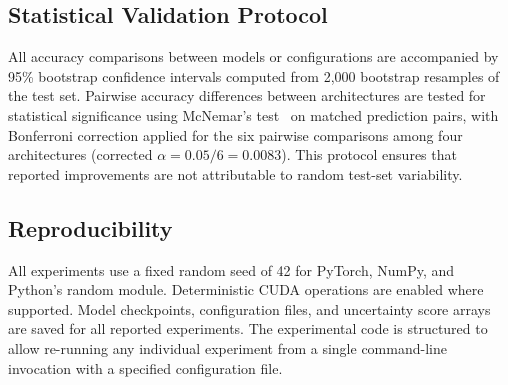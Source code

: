 \subsection{Statistical Validation Protocol}

All accuracy comparisons between models or configurations are accompanied by 95\% bootstrap confidence intervals computed from 2,000 bootstrap resamples of the test set. Pairwise accuracy differences between architectures are tested for statistical significance using McNemar's test~\cite{mcnemar1947note} on matched prediction pairs, with Bonferroni correction applied for the six pairwise comparisons among four architectures (corrected $\alpha = 0.05/6 = 0.0083$). This protocol ensures that reported improvements are not attributable to random test-set variability.

\subsection{Reproducibility}

All experiments use a fixed random seed of 42 for PyTorch, NumPy, and Python's random module. Deterministic CUDA operations are enabled where supported. Model checkpoints, configuration files, and uncertainty score arrays are saved for all reported experiments. The experimental code is structured to allow re-running any individual experiment from a single command-line invocation with a specified configuration file.